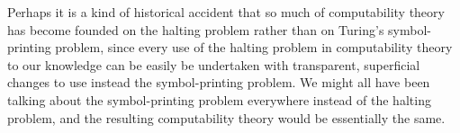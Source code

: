 \documentclass[12pt]{amsart}
\begin{document}
Perhaps it is a kind of historical accident that so much of computability theory has become founded on the halting problem rather than on Turing's symbol-printing problem, since every use of the halting problem in computability theory to our knowledge can be easily be undertaken with transparent, superficial changes to use instead the symbol-printing problem. We might all have been talking about the symbol-printing problem everywhere instead of the halting problem, and the resulting computability theory would be essentially the same.

\printbibliography
\end{document}
